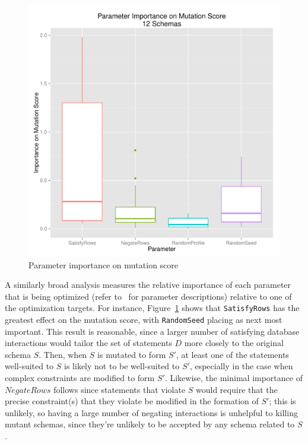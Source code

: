 \documentclass[a4paper,twocolumn]{article}
\begin{document}
\begin{figure}[t]
\begin{center}
\includegraphics[width=0.90\columnwidth]{mutation-score-importance.pdf}
\caption{Parameter importance on mutation score}
\end{center}
\label{fig:mut-param-imp}
\end{figure}

A similarly broad analysis measures the relative importance of each parameter that is being optimized (refer to~ for parameter descriptions) relative to one of the optimization targets. For instance, Figure~\ref{fig:mut-param-imp} shows that \texttt{SatisfyRows} has the greatest effect on the mutation score, with \texttt{RandomSeed} placing as next most important. This result is reasonable, since a larger number of satisfying database interactions would tailor the set of statements $D$ more closely to the original schema $S$. Then, when $S$ is mutated to form $S'$, at least one of the statements well-suited to $S$ is likely not to be well-suited to $S'$, especially in the case when complex constraints are modified to form $S'$. Likewise, the minimal importance of $NegateRows$ follows since statements that violate $S$ would require that the precise constraint(s) that they violate be modified in the formation of $S'$; this is unlikely, so having a large number of negating interactions is unhelpful to killing mutant schemas, since they're unlikely to be accepted by any schema related to $S$.
\end{document}
